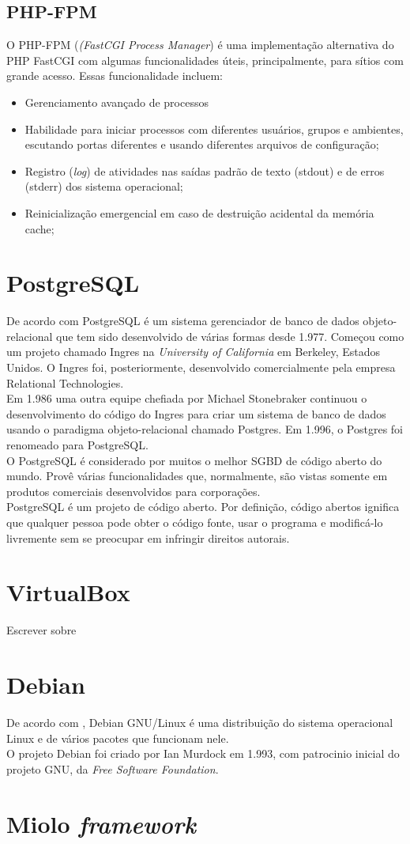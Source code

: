 \subsection{PHP-FPM}
O PHP-FPM (\textit{(FastCGI Process Manager}) é uma implementação alternativa do PHP FastCGI com algumas funcionalidades úteis, principalmente, para sítios com grande acesso. Essas funcionalidade incluem:
\begin{itemize}
	\item Gerenciamento avançado de processos
	\item Habilidade para iniciar processos com diferentes usuários, grupos e ambientes, escutando portas diferentes e usando diferentes arquivos de configuração;
	\item Registro (\textit{log}) de atividades nas saídas padrão de texto (stdout) e de erros (stderr) dos sistema operacional;
	\item Reinicialização emergencial em caso de destruição acidental da memória cache;
\end{itemize}
\section{PostgreSQL}
De acordo com  PostgreSQL é um sistema gerenciador de banco de dados objeto-relacional que tem sido desenvolvido de várias formas desde 1.977. Começou como um projeto chamado Ingres na \textit{University of California} em Berkeley, Estados Unidos. O Ingres foi, posteriormente, desenvolvido comercialmente pela empresa Relational Technologies.\\
Em 1.986 uma outra equipe chefiada por Michael Stonebraker continuou o desenvolvimento do código do Ingres para criar um sistema de banco de dados usando o paradigma objeto-relacional chamado Postgres. Em 1.996, o Postgres foi renomeado para PostgreSQL.\\
O PostgreSQL é considerado por muitos o melhor SGBD de código aberto do mundo. Provê várias funcionalidades que, normalmente, são vistas somente em produtos comerciais desenvolvidos para corporações.\\
PostgreSQL é um projeto de código aberto. Por definição, código abertos ignifica que qualquer pessoa pode obter o código fonte, usar o programa e modificá-lo livremente sem se preocupar em infringir direitos autorais.
\section{VirtualBox}
Escrever sobre
\section{Debian}
De acordo com , Debian GNU/Linux é uma distribuição do sistema operacional Linux e de vários pacotes que funcionam nele.\\
O projeto Debian foi criado por Ian Murdock em 1.993, com patrocinio inicial do 
projeto GNU, da \textit{Free Software Foundation}.
\section{Miolo \textit{framework}}